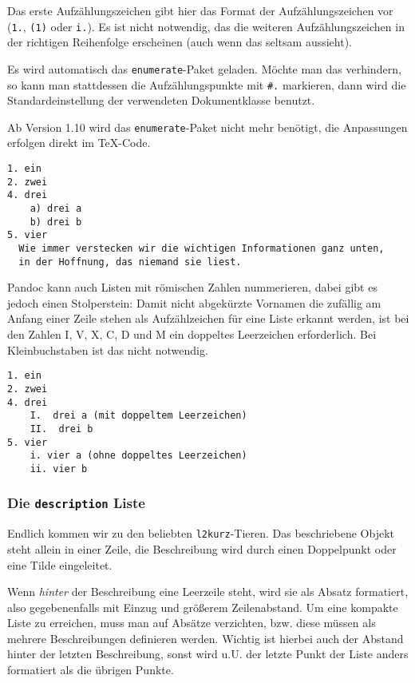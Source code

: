 \documentclass[11pt,ngerman,a4paper]{article}
\begin{document}
Das erste Aufzählungszeichen gibt hier das Format der Aufzählungszeichen
vor (\texttt{1.}, \texttt{(1)} oder \texttt{i.}). Es ist nicht
notwendig, das die weiteren Aufzählungszeichen in der richtigen
Reihenfolge erscheinen (auch wenn das seltsam aussieht).

Es wird automatisch das \texttt{enumerate}-Paket geladen. Möchte man das
verhindern, so kann man stattdessen die Aufzählungspunkte mit
\texttt{\#.} markieren, dann wird die Standardeinstellung der
verwendeten Dokumentklasse benutzt.

Ab Version 1.10 wird das \texttt{enumerate}-Paket nicht mehr benötigt,
die Anpassungen erfolgen direkt im TeX-Code.

\begin{verbatim}
1. ein
2. zwei
4. drei
    a) drei a
    b) drei b
5. vier
  Wie immer verstecken wir die wichtigen Informationen ganz unten,
  in der Hoffnung, das niemand sie liest.
\end{verbatim}

Pandoc kann auch Listen mit römischen Zahlen nummerieren, dabei gibt es
jedoch einen Stolperstein: Damit nicht abgekürzte Vornamen die zufällig
am Anfang einer Zeile stehen als Aufzählzeichen für eine Liste erkannt
werden, ist bei den Zahlen I, V, X, C, D und M ein doppeltes Leerzeichen
erforderlich. Bei Kleinbuchstaben ist das nicht notwendig.

\begin{verbatim}
1. ein
2. zwei
4. drei
    I.  drei a (mit doppeltem Leerzeichen)
    II.  drei b
5. vier
    i. vier a (ohne doppeltes Leerzeichen)
    ii. vier b
\end{verbatim}

\subsubsection{Die \texttt{description} Liste}

Endlich kommen wir zu den beliebten \texttt{l2kurz}-Tieren. Das
beschriebene Objekt steht allein in einer Zeile, die Beschreibung wird
durch einen Doppelpunkt oder eine Tilde eingeleitet.

Wenn \emph{hinter} der Beschreibung eine Leerzeile steht, wird sie als
Absatz formatiert, also gegebenenfalls mit Einzug und größerem
Zeilenabstand. Um eine kompakte Liste zu erreichen, muss man auf Absätze
verzichten, bzw. diese müssen als mehrere Beschreibungen definieren
werden. Wichtig ist hierbei auch der Abstand hinter der letzten
Beschreibung, sonst wird u.U. der letzte Punkt der Liste anders
formatiert als die übrigen Punkte.
\end{document}
